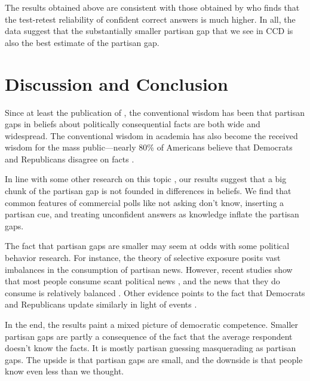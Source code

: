 \documentclass[12pt, letterpaper]{article}
\begin{document}
The results obtained above are consistent with those obtained by \citet{graham2021measuring} who finds that the test-retest reliability of confident correct answers is much higher. In all, the data suggest that the substantially smaller partisan gap that we see in CCD is also the best estimate of the partisan gap.

\section*{Discussion and Conclusion}\label{sec:discussion}

Since at least the publication of \cite{bartels_2002}, the conventional wisdom has been that partisan gaps in beliefs about politically consequential facts are both wide and widespread. The conventional wisdom in academia has also become the received wisdom for the mass public---nearly 80\% of Americans believe that Democrats and Republicans disagree on facts \citep{pew2018disagree}.

In line with some other research on this topic \citep[][though see \citeauthor{berinsky_2017} \citeyear{berinsky_2017} and \citeauthor{peterson_iyengar_forth} \citeyear{peterson_iyengar_forth}]{bullocketal_2015, prior2015you, schaffner_luks}, our results suggest that a big chunk of the partisan gap is not founded in differences in beliefs. We find that common features of commercial polls like not asking don't know, inserting a partisan cue, and treating unconfident answers as knowledge inflate the partisan gaps.

The fact that partisan gaps are smaller may seem at odds with some political behavior research. For instance, the theory of selective exposure posits vast imbalances in the consumption of partisan news. However, recent studies show that most people consume scant political news \citep{Prior2007,flaxmanetal_2016}, and the news that they do consume is relatively balanced \citep{flaxmanetal_2016,garzetal_2018,gentzkowshapiro_2011,guess_2020}. Other evidence points to the fact that Democrats and Republicans update similarly in light of events \citep{gerber_annual_review,kernell_2019, coppock2021persuasion}.

In the end, the results paint a mixed picture of democratic competence. Smaller partisan gaps are partly a consequence of the fact that the average respondent doesn't know the facts. It is mostly partisan guessing masquerading as partisan gaps. The upside is that partisan gaps are small, and the downside is that people know even less than we thought.

\clearpage



\clearpage


\end{document}
